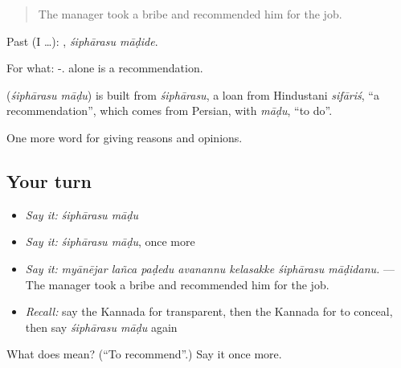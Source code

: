 \begin{quote}
The manager took a bribe and recommended him for the job.
\end{quote}

Past (I …):  , \emph{śiphārasu māḍide}.

For what: -.  alone is a recommendation.

\begin{cousinweb}
\textbf{ } (\emph{śiphārasu māḍu}) is built from \emph{śiphārasu}, a loan from Hindustani \emph{sifāriś}, \textquotedblleft{}a recommendation\textquotedblright{}, which comes from Persian, with \emph{māḍu}, \textquotedblleft{}to do\textquotedblright{}.
\end{cousinweb}

\begin{grammarlens}[title={What you've built}]
One more word for giving reasons and opinions.
\end{grammarlens}

\subsection*{Your turn}
\begin{itemize}
\raggedright
  \item \emph{Say it:} \emph{śiphārasu māḍu}
  \item \emph{Say it:} \emph{śiphārasu māḍu}, once more
  \item \emph{Say it:} \emph{myānējar lañca paḍedu avanannu kelasakke śiphārasu māḍidanu.} — The manager took a bribe and recommended him for the job.
  \item \emph{Recall:} say the Kannada for transparent, then the Kannada for to conceal, then say \emph{śiphārasu māḍu} again
\end{itemize}

\begin{tcolorbox}[breakable,colback=teal!4,colframe=teal!35!black,title={Before you move on}]
What does   mean? (\textquotedblleft{}To recommend\textquotedblright{}.) Say it once more.
\end{tcolorbox}
